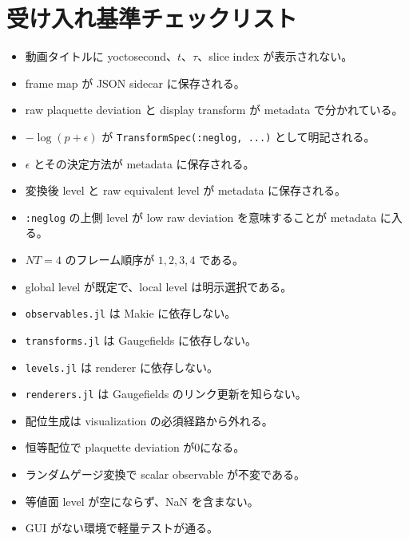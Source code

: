 \documentclass[uplatex,dvipdfmx,ja=standard,11pt,a4paper]{bxjsarticle}
\newcommand{\code}[1]{\texttt{#1}}
\begin{document}
\section{受け入れ基準チェックリスト}
\begin{itemize}[leftmargin=2em]
  \item 動画タイトルに yoctosecond、\(t\)、\(\tau\)、slice index が表示されない。
  \item frame map が JSON sidecar に保存される。
  \item raw plaquette deviation と display transform が metadata で分かれている。
  \item \(-\log(p+\epsilon)\) が \code{TransformSpec(:neglog, ...)} として明記される。
  \item \(\epsilon\) とその決定方法が metadata に保存される。
  \item 変換後 level と raw equivalent level が metadata に保存される。
  \item \code{:neglog} の上側 level が low raw deviation を意味することが metadata に入る。
  \item \(NT=4\) のフレーム順序が \(1,2,3,4\) である。
  \item global level が既定で、local level は明示選択である。
  \item \code{observables.jl} は Makie に依存しない。
  \item \code{transforms.jl} は Gaugefields に依存しない。
  \item \code{levels.jl} は renderer に依存しない。
  \item \code{renderers.jl} は Gaugefields のリンク更新を知らない。
  \item 配位生成は visualization の必須経路から外れる。
  \item 恒等配位で plaquette deviation が0になる。
  \item ランダムゲージ変換で scalar observable が不変である。
  \item 等値面 level が空にならず、NaN を含まない。
  \item GUI がない環境で軽量テストが通る。
\end{itemize}
\end{document}
